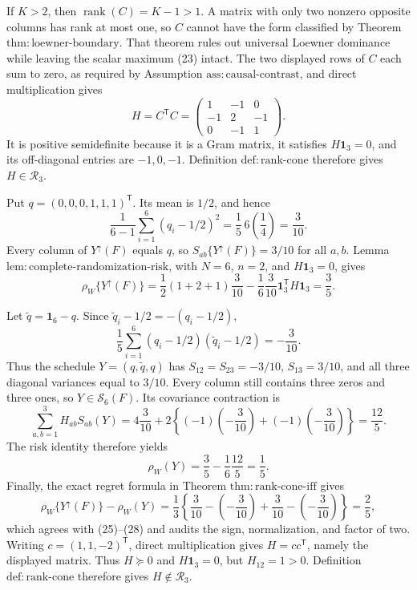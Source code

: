 If \(K>2\), then \(\operatorname{rank}(C)=K-1>1\).  A matrix with only two nonzero opposite columns has rank at most one, so \(C\) cannot have the form classified by Theorem \(\mathrm{thm{:}loewner\text{-}boundary}\).  That theorem rules out universal Loewner dominance while leaving the scalar maximum (23) intact.
The two displayed rows of \(C\) each sum to zero, as required by Assumption \(\mathrm{ass{:}causal\text{-}contrast}\), and direct multiplication gives
\[
H=C^{\mathsf T}C=
\begin{pmatrix}1&-1&0\\-1&2&-1\\0&-1&1\end{pmatrix}.
\]
It is positive semidefinite because it is a Gram matrix, it satisfies \(H\mathbf 1_3=0\), and its off-diagonal entries are \(-1,0,-1\).  Definition \(\mathrm{def{:}rank\text{-}cone}\) therefore gives \(H\in\mathcal R_3\).

Put \(q=(0,0,0,1,1,1)^{\mathsf T}\).  Its mean is \(1/2\), and hence
\[
\frac1{6-1}\sum_{i=1}^6(q_i-1/2)^2
=\frac15\,6\left(\frac14\right)=\frac3{10}. \tag{24}
\]
Every column of \(Y^{\uparrow}(F)\) equals \(q\), so \(S_{ab}\{Y^{\uparrow}(F)\}=3/10\) for all \(a,b\).  Lemma \(\mathrm{lem{:}complete\text{-}randomization\text{-}risk}\), with \(N=6\), \(n=2\), and \(H\mathbf 1_3=0\), gives
\[
\rho_W\{Y^{\uparrow}(F)\}
=\frac12(1+2+1)\frac3{10}
-\frac16\frac3{10}\mathbf 1_3^{\mathsf T}H\mathbf 1_3
=\frac35. \tag{25}
\]

Let \(\widetilde q=\mathbf 1_6-q\).  Since \(\widetilde q_i-1/2=-(q_i-1/2)\),
\[
\frac15\sum_{i=1}^6(q_i-1/2)(\widetilde q_i-1/2)=-\frac3{10}. \tag{26}
\]
Thus the schedule \(Y=(q,\widetilde q,q)\) has \(S_{12}=S_{23}=-3/10\), \(S_{13}=3/10\), and all three diagonal variances equal to \(3/10\).  Every column still contains three zeros and three ones, so \(Y\in\mathcal S_6(F)\).  Its covariance contraction is
\[
\sum_{a,b=1}^3H_{ab}S_{ab}(Y)
=4\frac3{10}+2\left\{(-1)\left(-\frac3{10}\right)+(-1)\left(-\frac3{10}\right)\right\}
=\frac{12}{5}. \tag{27}
\]
The risk identity therefore yields
\[
\rho_W(Y)=\frac35-\frac16\frac{12}{5}=\frac15. \tag{28}
\]
Finally, the exact regret formula in Theorem \(\mathrm{thm{:}rank\text{-}cone\text{-}iff}\) gives
\[
\rho_W\{Y^{\uparrow}(F)\}-\rho_W(Y)
=\frac13\left\{\frac3{10}-\left(-\frac3{10}\right)
+\frac3{10}-\left(-\frac3{10}\right)\right\}=\frac25, \tag{29}
\]
which agrees with (25)--(28) and audits the sign, normalization, and factor of two.
Writing \(c=(1,1,-2)^{\mathsf T}\), direct multiplication gives \(H=cc^{\mathsf T}\), namely the displayed matrix.  Thus \(H\succeq0\) and \(H\mathbf 1_3=0\), but \(H_{12}=1>0\).  Definition \(\mathrm{def{:}rank\text{-}cone}\) therefore gives \(H\notin\mathcal R_3\).

